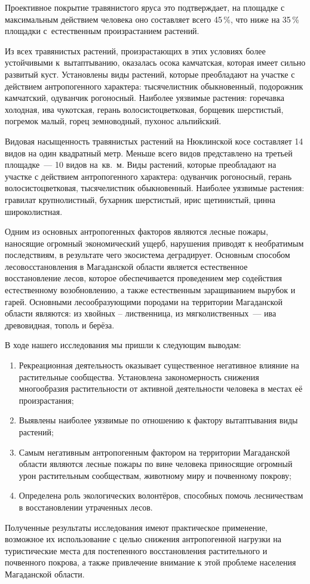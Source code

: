 Проективное покрытие травянистого яруса это подтверждает, на площадке с максимальным действием человека оно составляет всего 45\,\%, что ниже на 35\,\% площадки с~естественным произрастанием растений.

Из всех травянистых растений, произрастающих в этих условиях более устойчивыми к~вытаптыванию, оказалась осока камчатская, которая имеет сильно развитый куст. Установлены виды растений, которые преобладают на участке с действием антропогенного характера: тысячелистник обыкновенный, подорожник камчатский, одуванчик рогоносный. Наиболее уязвимые растения: горечавка холодная, ива чукотская, герань волосистоцветковая, борщевик шерстистый, погремок малый, горец земноводный, пухонос альпийский.

Видовая насыщенность травянистых растений на Нюклинской косе составляет 14 видов на один квадратный метр. Меньше всего видов представлено на третьей площадке~--- 10 видов на~кв.~м. Виды растений, которые преобладают на участке с действием антропогенного характера: одуванчик рогоносный, герань волосистоцветковая, тысячелистник обыкновенный. Наиболее уязвимые растения: гравилат крупнолистный, бухарник шерстистый, ирис щетинистый, цинна широколистная.

Одним из основных антропогенных факторов являются лесные пожары, наносящие огромный экономический ущерб, нарушения приводят к необратимым последствиям, в результате чего экосистема деградирует. Основным способом лесовосстановления в Магаданской области является естественное восстановление лесов, которое обеспечивается проведением мер содействия естественному возобновлению, а также естественным заращиванием вырубок и гарей. Основными лесообразующими породами на территории Магаданской области являются: из хвойных – лиственница, из мягколиственных~--- ива древовидная, тополь и берёза.

В ходе нашего исследования мы пришли к следующим выводам:

\begin{enumerate}[noitemsep]\vspace{-8pt}
\item Рекреационная деятельность оказывает существенное негативное влияние на растительные сообщества. Установлена закономерность снижения многообразия растительности от активной деятельности человека в местах её произрастания;
\item Выявлены наиболее уязвимые по отношению к фактору вытаптывания виды растений;
\item Самым негативным антропогенным фактором на территории Магаданской области являются лесные пожары по вине человека приносящие огромный урон растительным сообществам, животному миру и почвенному покрову;
\item Определена роль экологических волонтёров, способных помочь лесничествам в восстановлении утраченных лесов.
\end{enumerate}\vspace{-8pt}

Полученные результаты исследования имеют практическое применение, возможное их использование с целью снижения антропогенной нагрузки на туристические места для постепенного восстановления растительного и почвенного покрова, а также привлечение внимание к этой проблеме населения Магаданской области.
